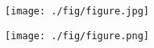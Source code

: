 
\begin{center}
\texttt{[image: ./fig/figure.jpg]}
\end{center}

\begin{center}
\texttt{[image: ./fig/figure.png]}
\end{center}
